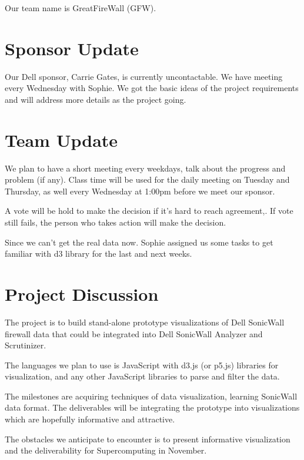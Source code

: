 \documentclass[paper=a4, fontsize=11pt]{scrartcl} %
\begin{document}
\maketitle %

Our team name is GreatFireWall (GFW).

\section{Sponsor Update} %
\label{sec:sponsor_update}
Our Dell sponsor, Carrie Gates, is currently uncontactable.
We have meeting every Wednesday with Sophie.
We got the basic ideas of the project requirements and will address more details as the project going.


\section{Team Update} %
\label{sec:team_update}
We plan to have a short meeting every weekdays, talk about the progress and problem (if any). Class time will be used for the daily meeting on Tuesday and Thursday, as well every Wednesday at 1:00pm before we meet our sponsor.

A vote will be hold to make the decision if it's hard to reach agreement,. If vote still fails, the person who takes action will make the decision.

Since we can't get the real data now. Sophie assigned us some tasks to get familiar with d3 library for the last and next weeks.


\section{Project Discussion} %
\label{sec:project_discussion}
The project is to build stand-alone prototype visualizations of Dell SonicWall firewall data that could be integrated into Dell SonicWall Analyzer and Scrutinizer.

The languages we plan to use is JavaScript with d3.js (or p5.js) libraries for visualization, and any other JavaScript libraries to parse and filter the data.

The milestones are acquiring techniques of data visualization, learning SonicWall data format. The deliverables will be integrating the prototype into visualizations which are hopefully informative and attractive.

The obstacles we anticipate to encounter is to present informative visualization and the deliverability for Supercomputing in November.
\end{document}
